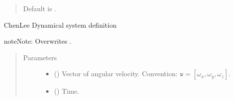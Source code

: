 \documentclass[a4paper,landscape,10pt,english]{sphinxmanual}
\begin{document}
\begin{fulllineitems}
\begin{fulllineitems}
\begin{quote}
\begin{description}
\begin{itemize}
Default is  .


\end{itemize}

\end{description}\end{quote}

\end{fulllineitems}


\begin{fulllineitems}
\label{\detokenize{code_docs/simulation_api.simulation:simulation_api.simulation.simulations.ChenLeeAttractor.dyn_sys_eqns}}
Chen\sphinxhyphen{}Lee Dynamical system definition

\begin{sphinxadmonition}{note}{Note:}
Overwrites {\hyperref[\detokenize{code_docs/simulation_api.simulation:simulation_api.simulation.simulations.Simulation.dyn_sys_eqns}]{}}.
\end{sphinxadmonition}
\begin{quote}\begin{description}
\item[{Parameters}] \leavevmode\begin{itemize}
\item {} 
 (\sphinxstyleliteralemphasis{\sphinxupquote{, }}\sphinxstyleliteralemphasis{\sphinxupquote{ (}}\sphinxstyleliteralemphasis{\sphinxupquote{,}}\sphinxstyleliteralemphasis{\sphinxupquote{)}}) \textendash{} Vector of angular velocity.
Convention: \(\texttt{w} = [\omega_x, \omega_y, \omega_z]\).

\item {} 
 () \textendash{} Time.


\end{itemize}
\end{description}
\end{quote}
\end{fulllineitems}
\end{fulllineitems}
\end{document}
